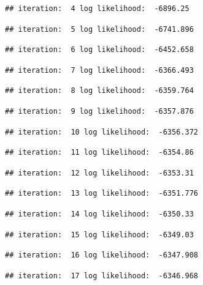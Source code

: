 \documentclass[
]{article}
\begin{document}
\begin{verbatim}
## iteration:  4 log likelihood:  -6896.25
\end{verbatim}

\begin{verbatim}
## iteration:  5 log likelihood:  -6741.896
\end{verbatim}

\begin{verbatim}
## iteration:  6 log likelihood:  -6452.658
\end{verbatim}

\begin{verbatim}
## iteration:  7 log likelihood:  -6366.493
\end{verbatim}

\begin{verbatim}
## iteration:  8 log likelihood:  -6359.764
\end{verbatim}

\begin{verbatim}
## iteration:  9 log likelihood:  -6357.876
\end{verbatim}

\begin{verbatim}
## iteration:  10 log likelihood:  -6356.372
\end{verbatim}

\begin{verbatim}
## iteration:  11 log likelihood:  -6354.86
\end{verbatim}

\begin{verbatim}
## iteration:  12 log likelihood:  -6353.31
\end{verbatim}

\begin{verbatim}
## iteration:  13 log likelihood:  -6351.776
\end{verbatim}

\begin{verbatim}
## iteration:  14 log likelihood:  -6350.33
\end{verbatim}

\begin{verbatim}
## iteration:  15 log likelihood:  -6349.03
\end{verbatim}

\begin{verbatim}
## iteration:  16 log likelihood:  -6347.908
\end{verbatim}

\begin{verbatim}
## iteration:  17 log likelihood:  -6346.968
\end{verbatim}
\end{document}
